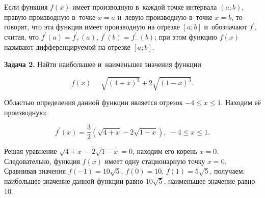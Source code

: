 \begin{figure}\label{fig:5_5_4}
\end{figure}

Если функция $f(x)$ имеет производную в~каждой точке интервала $(a; b)$,
правую производную в~точке $x = a$ и~левую производную в~точке $x = b$, то говорят,
что эта функция имеет производную на отрезке $[a; b]$ и~обозначают $f^\prime$,
считая, что $f^\prime (a) = f^\prime_{+} (a)$, $f^\prime (b) = f^\prime_{-} (b)$;
при этом функцию $f(x)$ называют дифференцируемой на отрезке $[a; b]$.

\textbf{Задача 2.}\label{ex:5_5_2} Найти наибольшее и~наименьшее значения функции

\begin{equation*}
f(x) = \sqrt{(4 + x)^{3}} + 2\sqrt{(1 - x)^{3}}.
\end{equation*}

Областью определения данной функции является отрезок $-4 \leqslant x \leqslant 1$.
Находим её производную:

\begin{equation*}
\displaystyle f^\prime (x) = 
\frac{3}{2}\left( \sqrt{4 + x} -2\sqrt{1 - x} \right), \; -4 \leqslant x \leqslant 1.
\end{equation*}

Решая уравнение $\sqrt{4 + x} - 2\sqrt{1 - x} = 0$, находим его корень $x = 0$.
Следовательно, функция $f(x)$ имеет одну стационарную точку $x = 0$.
Сравнивая значения $f(-1) = 10\sqrt{5}$, $f(0) = 10$, $f(1) = 5\sqrt{5}$, получаем:
наибольшее значение данной функции равно $10\sqrt{5}$,
наименьшее значение равно 10.


